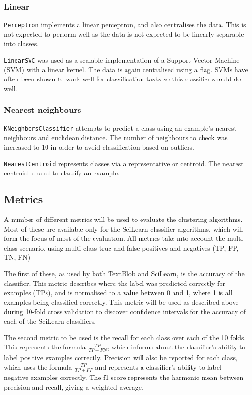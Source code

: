\documentclass{article}
\begin{document}
\subsubsection{Linear}
\verb|Perceptron| implements a linear perceptron, and also centralises the data. This is not expected to perform well as the data is not expected to be linearly separable into classes.

\verb|LinearSVC| was used as a scalable implementation of a Support Vector Machine (SVM) with a linear kernel. The data is again centralised using a flag. SVMs have often been shown to work well for classification tasks so this classifier should do well.

\subsubsection{Nearest neighbours}
\verb|KNeighborsClassifier| attempts to predict a class using an example's nearest neighbours and euclidean distance. The number of neighbours to check was increased to 10 in order to avoid classification based on outliers. 

\verb|NearestCentroid| represents classes via a representative or centroid.  The nearest centroid is used to classify an example.

\subsection{Metrics}
A number of different metrics will be used to evaluate the clustering algorithms. Most of these are available only for the SciLearn classifier algorithms, which will form the focus of most of the evaluation. All metrics take into account the multi-class scenario, using multi-class true and false positives and negatives (TP, FP, TN, FN).

The first of these, as used by both TextBlob and SciLearn, is the accuracy of the classifier. This metric describes where the label was predicted correctly for examples (TPs), and is normalised to a value between 0 and 1, where 1 is all examples being classified correctly. This metric will be used as described above during 10-fold cross validation to discover confidence intervals for the accuracy of each of the SciLearn classifiers.

The second metric to be used is the recall for each class over each of the 10 folds. This represents the formula $\frac{TP}{TP+FN}$, which informs about the classifier's ability to label positive examples correctly. Precision will also be reported for each class, which uses the formula $\frac{TP}{TP+FP}$ and represents a classifier's ability to label negative examples correctly. The f1 score represents the harmonic mean between precision and recall, giving a weighted average. 
\end{document}
